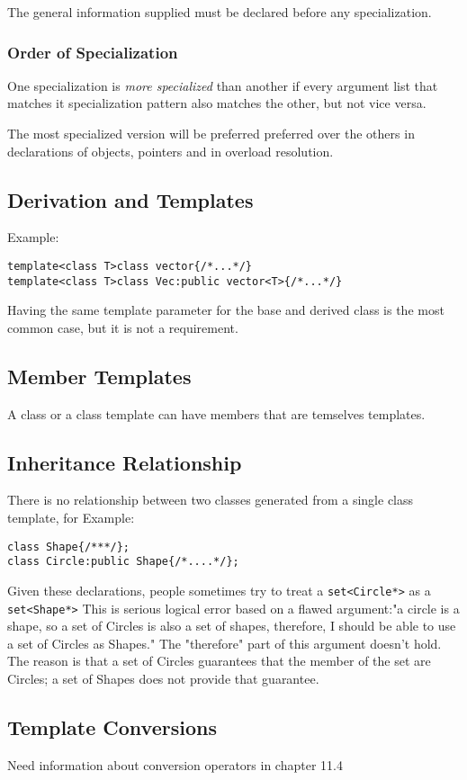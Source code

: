 \documentclass[11pt, a4paper]{book}
\begin{document}
The general information supplied must be declared before any specialization.

\subsubsection{Order of Specialization}
One specialization is \emph{more specialized} than another if every argument list that matches it specialization pattern also matches the other, but not vice versa.

The most specialized version will be preferred preferred over the others in declarations of objects, pointers and in overload resolution.
\subsection{Derivation and Templates}
Example:
\begin{verbatim}
template<class T>class vector{/*...*/}
template<class T>class Vec:public vector<T>{/*...*/}
\end{verbatim}
Having the same template parameter for the base and derived class is the most common case, but it is not a requirement. 
\subsection{Member Templates}
A class or a class template can have members that are temselves templates.
\subsection{Inheritance Relationship}
There is no relationship between two classes generated from a single class template, for Example:
\begin{verbatim}
class Shape{/***/};
class Circle:public Shape{/*....*/};
\end{verbatim}
Given these declarations, people sometimes try to treat a \verb|set<Circle*>| as a \verb|set<Shape*>|
This is serious logical error based on a flawed argument:"a circle is a shape, so a set of Circles is also a set of shapes, therefore, I should be able to use a set of Circles as Shapes." The "therefore" part of this argument doesn't hold. The reason is that a set of Circles guarantees that the member of the set are Circles; a set of Shapes does not provide that guarantee.
\subsection{Template Conversions}
Need information about conversion operators in chapter 11.4
\end{document}
